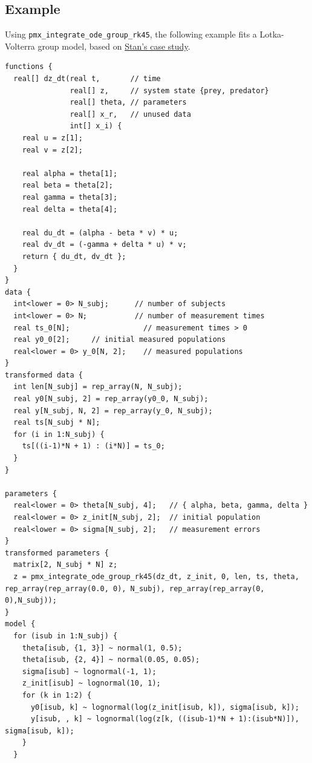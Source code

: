 \documentclass[11pt, reqno, oneside]{amsbook}
\numberwithin{equation}{chapter}
\numberwithin{figure}{chapter}
\numberwithin{table}{chapter}
\theoremstyle{remark}
\begin{document}
\subsection{Example}
\label{sec:org2e084f9}
Using \texttt{pmx\_integrate\_ode\_group\_rk45}, the following example fits
a Lotka-Volterra group model, based on \href{https://mc-stan.org/users/documentation/case-studies/lotka-volterra-predator-prey.html}{Stan's case study}.

\begin{verbatim}
functions {
  real[] dz_dt(real t,       // time
               real[] z,     // system state {prey, predator}
               real[] theta, // parameters
               real[] x_r,   // unused data
               int[] x_i) {
    real u = z[1];
    real v = z[2];

    real alpha = theta[1];
    real beta = theta[2];
    real gamma = theta[3];
    real delta = theta[4];

    real du_dt = (alpha - beta * v) * u;
    real dv_dt = (-gamma + delta * u) * v;
    return { du_dt, dv_dt };
  }
}
data {
  int<lower = 0> N_subj;      // number of subjects
  int<lower = 0> N;           // number of measurement times
  real ts_0[N];                 // measurement times > 0
  real y0_0[2];     // initial measured populations
  real<lower = 0> y_0[N, 2];    // measured populations
}
transformed data {
  int len[N_subj] = rep_array(N, N_subj);
  real y0[N_subj, 2] = rep_array(y0_0, N_subj);
  real y[N_subj, N, 2] = rep_array(y_0, N_subj);
  real ts[N_subj * N];
  for (i in 1:N_subj) {
    ts[((i-1)*N + 1) : (i*N)] = ts_0;
  }
}

parameters {
  real<lower = 0> theta[N_subj, 4];   // { alpha, beta, gamma, delta }
  real<lower = 0> z_init[N_subj, 2];  // initial population
  real<lower = 0> sigma[N_subj, 2];   // measurement errors
}
transformed parameters {
  matrix[2, N_subj * N] z;
  z = pmx_integrate_ode_group_rk45(dz_dt, z_init, 0, len, ts, theta, rep_array(rep_array(0.0, 0), N_subj), rep_array(rep_array(0, 0),N_subj));
}
model {
  for (isub in 1:N_subj) {
    theta[isub, {1, 3}] ~ normal(1, 0.5);
    theta[isub, {2, 4}] ~ normal(0.05, 0.05);
    sigma[isub] ~ lognormal(-1, 1);
    z_init[isub] ~ lognormal(10, 1);
    for (k in 1:2) {
      y0[isub, k] ~ lognormal(log(z_init[isub, k]), sigma[isub, k]);
      y[isub, , k] ~ lognormal(log(z[k, ((isub-1)*N + 1):(isub*N)]), sigma[isub, k]);
    }
  }
\end{verbatim}
\end{document}
